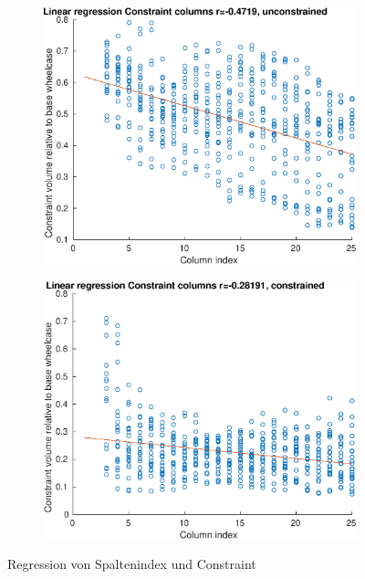 \begin{figure}[h]
	\centering
	\begin{subfigure}[t]{0.5\textwidth}
		\centering
		\includegraphics[width=1\linewidth]{bilder/6pt1000Samples/conRegressionUnconCol}
	\end{subfigure}\hfill
	\begin{subfigure}[t]{0.5\textwidth}
		\centering
		\includegraphics[width=1\linewidth]{bilder/6pt1000Samples/conRegressionConCol}
	\end{subfigure}
	\caption{Regression von Spaltenindex und Constraint}
	\label{fig:regConCol}
\end{figure}

